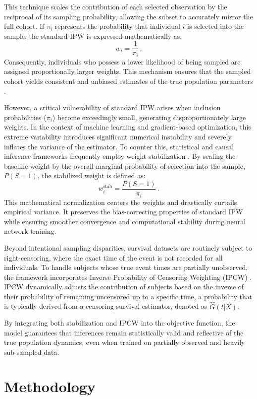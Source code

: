 \documentclass[a4paper,twoside,12pt]{report}
\begin{document}
This technique scales the contribution of each selected observation by the reciprocal of its sampling probability, allowing the subset to accurately mirror the full cohort. If $\pi_i$ represents the probability that individual $i$ is selected into the sample, the standard IPW is expressed mathematically as:
$$w_i = \frac{1}{\pi_i} \,.$$
Consequently, individuals who possess a lower likelihood of being sampled are assigned proportionally larger weights. This mechanism ensures that the sampled cohort yields consistent and unbiased estimates of the true population parameters \citep{Prentice1986, Borgan2000}.

However, a critical vulnerability of standard IPW arises when inclusion probabilities ($\pi_i$) become exceedingly small, generating disproportionately large weights. In the context of machine learning and gradient-based optimization, this extreme variability introduces significant numerical instability and severely inflates the variance of the estimator. To counter this, statistical and causal inference frameworks frequently employ weight stabilization \citep{Robins2000, Hernan2000}. By scaling the baseline weight by the overall marginal probability of selection into the sample, $P(S=1)$, the stabilized weight is defined as:
$$w_i^{\text{stab}} = \frac{P(S=1)}{\pi_i} \,.$$
This mathematical normalization centers the weights and drastically curtails empirical variance. It preserves the bias-correcting properties of standard IPW while ensuring smoother convergence and computational stability during neural network training.

Beyond intentional sampling disparities, survival datasets are routinely subject to right-censoring, where the exact time of the event is not recorded for all individuals. To handle subjects whose true event times are partially unobserved, the framework incorporates Inverse Probability of Censoring Weighting (IPCW) \citep{Graf1999}. IPCW dynamically adjusts the contribution of subjects based on the inverse of their probability of remaining uncensored up to a specific time, a probability that is typically derived from a censoring survival estimator, denoted as $\hat{G}(t|X)$. 

By integrating both stabilization and IPCW into the objective function, the model guarantees that inferences remain statistically valid and reflective of the true population dynamics, even when trained on partially observed and heavily sub-sampled data.


\chapter{Methodology}
\label{ch:methodology}
\end{document}
